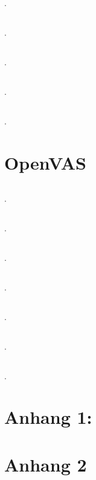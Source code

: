 \documentclass[twoside]{article}
\begin{document}
\subsection{}.
\subsection{}.
\subsection{}.
\subsection{}.
\subsection{}.


\section{OpenVAS}
\subsection{}.
\subsection{}.
\subsection{}.
\subsection{}.
\subsection{}.
\subsection{}.
\subsection{}.

\newpage
\section*{Anhang 1:}

\section*{Anhang 2}
\end{document}
